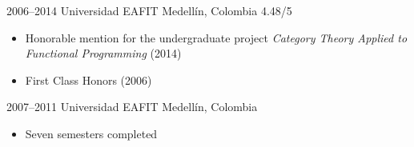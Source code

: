 
\cventry
{2006--2014}
{}
{Universidad EAFIT}
{Medellín, Colombia}
{4.48/5}
{
  \begin{itemize}
  \item
    Honorable mention for the undergraduate project \emph{Category
      Theory Applied to Functional Programming} (2014)
  \item
    First Class Honors (2006)
  \end{itemize}
}

\cventry
{2007--2011}
{}
{Universidad EAFIT}
{Medellín, Colombia}
{}
{
  \begin{itemize}
  \item
    Seven semesters completed
  \end{itemize}
}

